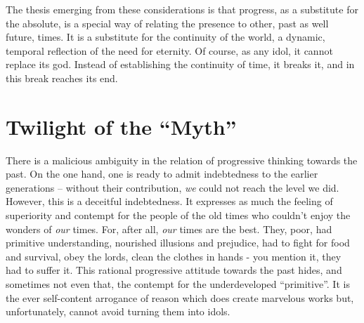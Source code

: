 The thesis emerging from these considerations is that progress, as a substitute
for the absolute, is a special way of relating the presence to other, past
as well future, times. It is a substitute for the continuity of the world,
a dynamic, temporal reflection of the need for eternity. Of course, as any
idol, it cannot replace its god. Instead of establishing the continuity of
time, it breaks it, and in this break reaches its end.

\section{Twilight of the ``Myth''}
There is a malicious ambiguity in the relation of progressive thinking towards
 the past. On the one hand, one is ready to admit indebtedness
to the earlier generations -- without their contribution, {\em we} could not
reach the level we did. However, this is a deceitful indebtedness. It expresses
as much the feeling of superiority and contempt for the people of the old
times who couldn't enjoy the wonders of {\em our} times. For, after all,
{\em our} times are the best. They, poor, had primitive understanding, nourished 
illusions and prejudice, had to fight for food and survival, obey the lords, 
clean the clothes in hands - you mention it, they had to suffer it. This
rational progressive attitude towards the past hides, and sometimes not even 
that, the contempt for the underdeveloped ``primitive''. It is the ever 
self-content arrogance of reason which does create marvelous works but,
unfortunately, cannot avoid turning them into idols.

